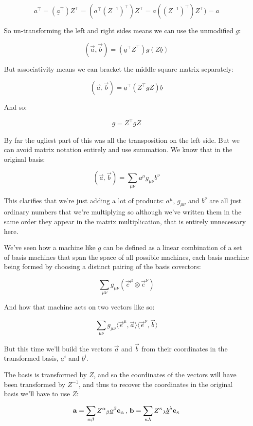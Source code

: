 $$
a^\intercal = (\underline{a}^\intercal)Z^\intercal = (a^\intercal (Z^{-1})^\intercal) Z^\intercal = a((Z^{-1})^\intercal) Z^\intercal) = a
$$

So un-transforming the left and right sides means we can use the unmodified $g$:

$$
(\vec{a}, \vec{b}) = (\underline{a}^\intercal Z^\intercal) g (Z \underline{b}) 
$$

But associativity means we can bracket the middle square matrix separately:

$$
(\vec{a}, \vec{b}) = \underline{a}^\intercal (Z^\intercal g Z) \underline{b} 
$$

And so:

$$
\underline{g} = Z^\intercal g Z
$$

By far the ugliest part of this was all the transposition on the left side. But we can avoid matrix notation entirely and use summation. We know that in the original basis:

$$
(\vec{a}, \vec{b}) = \sum_{\mu\nu} a^{\mu} g_{\mu\nu} b^{\nu}
$$

This clarifies that we're just adding a lot of products: $a^{\mu}$, $g_{\mu\nu}$ and $b^{\nu}$ are all just ordinary numbers that we're multiplying so although we've written them in the same order they appear in the matrix multiplication, that is entirely unnecessary here.

We've seen how a machine like $g$ can be defined as a linear combination of a set of basis machines that span the space of all possible machines, each basis machine being formed by choosing a distinct pairing of the basis covectors:

$$
\sum_{\mu\nu} g_{\mu\nu} (\vec{e}^\mu \otimes \vec{e}^\nu)
$$

And how that machine acts on two vectors like so:

$$
\sum_{\mu\nu} g_{\mu\nu} \langle \vec{e}^\mu,\vec{a} \rangle \langle \vec{e}^\nu,\vec{b} \rangle
$$

But this time we'll build the vectors $\vec{a}$ and $\vec{b}$ from their coordinates in the transformed basis, $\underline{a}^{i}$ and $\underline{b}^{i}$.

The basis is transformed by $Z$, and so the coordinates of the vectors will have been transformed by $Z^{-1}$, and thus to recover the coordinates in the original basis we'll have to use $Z$:

$$
\vec{a} = \sum_{\alpha\beta} Z\indices{^\alpha_\beta} \underline{a}^{\beta} \vec{e}_{\alpha}
\, , \,
\vec{b} = \sum_{\kappa\lambda} Z\indices{^\kappa_\lambda} \underline{b}^{\lambda} \vec{e}_{\kappa}
$$

